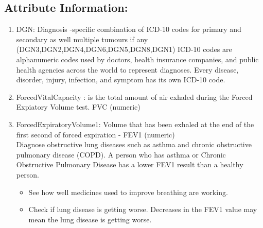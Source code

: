 \documentclass[a4paper, 11pt, oneside]{article} %
\begin{document}
\subsection{Attribute Information:} 
\begin{enumerate} 
\item DGN: Diagnosis -specific combination of ICD-10 codes for primary and secondary as well multiple tumours if any (DGN3,DGN2,DGN4,DGN6,DGN5,DGN8,DGN1)
ICD-10 codes are alphanumeric codes used by doctors, health insurance companies, and public health agencies across the world to represent diagnoses. Every disease, disorder, injury, infection, and symptom has its own ICD-10 code. 
\item ForcedVitalCapacity : is the total amount of air exhaled during the Forced Expiatory Volume test. FVC (numeric) 
\item ForcedExpiratoryVolume1: Volume that has been exhaled at the end of the first second of forced expiration - FEV1 (numeric)\\
Diagnose obstructive lung diseases such as asthma and chronic obstructive pulmonary disease (COPD). A person who has asthma or Chronic Obstructive Pulmonary Disease has a lower FEV1 result than a healthy person.
\begin{itemize}
\item See how well medicines used to improve breathing are working.
\item Check if lung disease is getting worse. Decreases in the FEV1 value may mean the lung disease is getting worse.
\end{itemize}


\end{enumerate}
\end{document}
